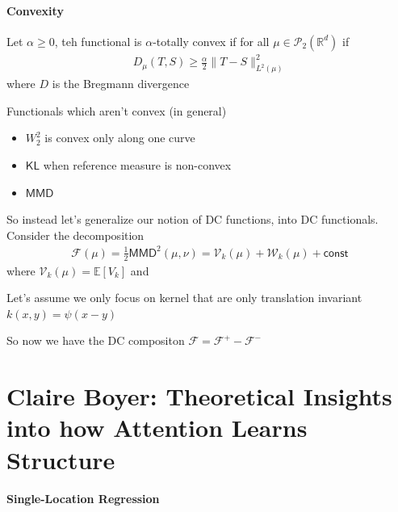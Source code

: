 \documentclass[11pt,fleqn]{article}
\numberwithin{equation}{section}
\theoremstyle{definition}
\theoremstyle{definition}
\begin{document}
\paragraph{Convexity}
\begin{definition}
	Let $\alpha \geq 0$, teh functional is $\alpha$-totally convex if for all $\mu \in \mathcal P_2(\mathbb R^d)$ if
	\begin{align}
		D_\mu(T,S) \geq \frac{\alpha}{2}\|T - S\|_{L^2(\mu)}^2
	\end{align}
	where $D$ is the Bregmann divergence
\end{definition}

\begin{eg}
	Functionals which aren't convex (in general)
	\begin{itemize}
		\item $W_2^2$ is convex only along one curve
		\item $\textsf{KL}$ when reference measure is non-convex
		\item $\textsf{MMD}$
	\end{itemize}
\end{eg}
So instead let's generalize our notion of DC functions, into DC functionals. Consider the decomposition
\begin{align}
	\mathcal F(\mu) = \frac{1}{2} \textsf{MMD}^2(\mu, \nu) = \mathcal V_k(\mu) + \mathcal W_k(\mu) + \textsf{const}
\end{align}
where $\mathcal V_k(\mu) = \mathbb E[V_k]$ and
\begin{assumption}
	Let's assume we only focus on kernel that are only translation invariant $k(x,y) = \psi(x-y)$
\end{assumption}
So now we have the DC compositon $\mathcal F = \mathcal F^+ - \mathcal F^-$


\newpage
\section{Claire Boyer: Theoretical Insights into how Attention Learns Structure}
\paragraph{Single-Location Regression}
\end{document}
